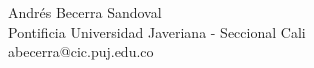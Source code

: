 \vspace{0.25in}
\begin{flushleft}
Andrés Becerra Sandoval \\
Pontificia Universidad Javeriana - Seccional Cali \\
abecerra@cic.puj.edu.co \\

\end{flushleft}


